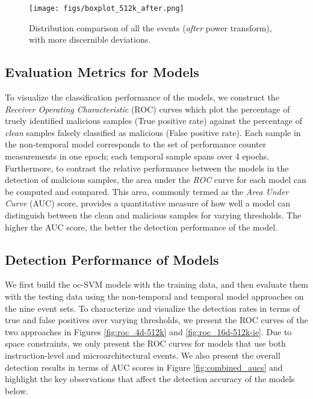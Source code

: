 \documentclass{acm_proc_article-sp}
\begin{document}
\begin{figure*}
  \centering
  \texttt{[image: figs/boxplot\_512k\_after.png]}
  \caption{Distribution comparison of all the events (\textit{after} power transform), with more discernible deviations.}
  \label{fig:univariate_after}
\end{figure*}


\subsection{Evaluation Metrics for Models}


To visualize the classification performance of the models, we construct the \emph{Receiver Operating Characteristic} (ROC) curves which plot the percentage of truely identified malicious samples (True positive rate) against the percentage of \textit{clean} samples falsely classified as malicious (False positive rate). Each sample in the non-temporal model corresponds to the set of performance counter measurements in one epoch; each temporal sample spans over 4 epochs. Furthermore, to contrast the relative performance between the models in the detection of malicious samples, the area under the \emph{ROC} curve for each model can be computed and compared. This area, commonly termed as the \emph{Area Under Curve} (AUC) score, provides a quantitative measure of how well a model can distinguish between the clean and malicious samples for varying thresholds. The higher the AUC score, the better the detection performance of the model.


\subsection{Detection Performance of Models}
\label{sec:eval_auc}

We first build the oc-SVM models with the training data, and then evaluate them with the testing data using the non-temporal and temporal model approaches on the nine event sets. To characterize and visualize the detection rates in terms of true and false positives over varying thresholds, we present the ROC curves of the two approaches in Figures \ref{fig:roc_4d-512k} and \ref{fig:roc_16d-512k-ie}. Due to space constraints, we only present the ROC curves for models that use both instruction-level and microarchitectural events. We also present the overall detection results in terms of AUC scores in Figure \ref{fig:combined_aucs} and highlight the key observations that affect the detection accuracy of the models below.
\end{document}
